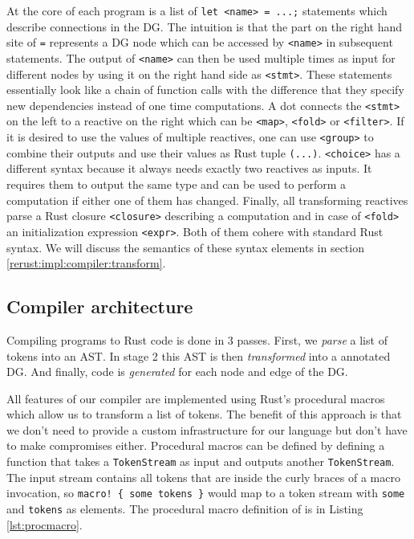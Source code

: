 At the core of each \rerust program is a list of \lstinline{let <name> = ...;} statements which describe connections in the \ac{DG}. The intuition is that the part on the right hand site of \lstinline{=} represents a \ac{DG} node which can be accessed by \lstinline{<name>} in subsequent statements. The output of \lstinline{<name>} can then be used multiple times as input for different nodes by using it on the right hand side as \lstinline{<stmt>}. These statements essentially look like a chain of function calls with the difference that they specify new dependencies instead of one time computations. A dot connects the \lstinline{<stmt>} on the left to a reactive on the right which can be \lstinline{<map>}, \lstinline{<fold>} or \lstinline{<filter>}. If it is desired to use the values of multiple reactives, one can use \lstinline{<group>} to combine their outputs and use their values as Rust tuple \lstinline{(...)}. \lstinline{<choice>} has a different syntax because it always needs exactly two reactives as inputs. It requires them to output the same type and can be used to perform a computation if either one of them has changed. Finally, all transforming reactives parse a Rust closure \lstinline{<closure>} describing a computation and in case of \lstinline{<fold>} an initialization expression \lstinline{<expr>}. Both of them cohere with standard Rust syntax. We will discuss the semantics of these syntax elements in section \ref{rerust:impl:compiler:transform}.

\subsection{Compiler architecture}
\label{rerust:impl:compiler}
Compiling \rerust programs to Rust code is done in 3 passes. First, we \emph{parse} a list of tokens into an \ac{AST}. In stage 2 this \ac{AST} is then \emph{transformed} into a annotated \ac{DG}. And finally, code is \emph{generated} for each node and edge of the \ac{DG}.

All features of our compiler are implemented using Rust's procedural macros which allow us to transform a list of tokens. The benefit of this approach is that we don't need to provide a custom infrastructure for our language but don't have to make compromises either. Procedural macros can be defined by defining a function that takes a \lstinline{TokenStream} as input and outputs another \lstinline{TokenStream}. The input stream contains all tokens that are inside the curly braces of a macro invocation, so \lstinline|macro! { some tokens }| would map to a token stream with \lstinline{some} and \lstinline{tokens} as elements. The procedural macro definition of \rerust is in Listing \ref{lst:procmacro}.

